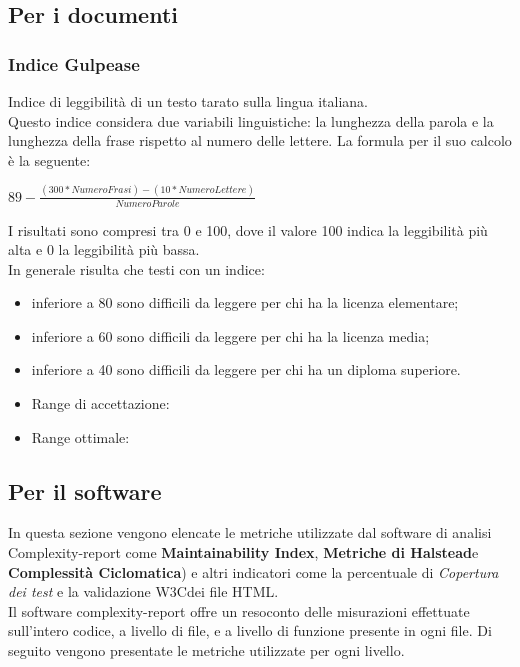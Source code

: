\documentclass[a4paper,11pt]{article}
\begin{document}
\subsection{Per i documenti}

\subsubsection{Indice Gulpease} Indice di leggibilità di un testo tarato sulla lingua italiana. \\
Questo indice considera due variabili linguistiche: la lunghezza della parola e la lunghezza della frase rispetto al numero delle lettere.
La formula per il suo calcolo è la seguente:\\
\begin{center}
\begin{math}
89 - \frac{(300 * NumeroFrasi) - (10 * NumeroLettere)}{NumeroParole}
\end{math}
\end{center}
I risultati sono compresi tra 0 e 100, dove il valore 100 indica la leggibilità più alta e 0 la leggibilità più bassa.\\
In generale risulta che testi con un indice:
\begin{itemize}
\item inferiore a 80 sono difficili da leggere per chi ha la licenza elementare;
\item inferiore a 60 sono difficili da leggere per chi ha la licenza media;
\item inferiore a 40 sono difficili da leggere per chi ha un diploma superiore.
\end{itemize}
\begin{itemize}
\item Range di accettazione: \begin{math}[50 - 100]\end{math}
\item Range ottimale: \begin{math}[60 - 100]\end{math}
\end{itemize}
\subsection{Per il software}

In questa sezione vengono elencate le metriche utilizzate dal software di analisi Complexity-report come \textbf{Maintainability Index}\addglos, \textbf{Metriche di Halstead}\addglos e \textbf{Complessità Ciclomatica}\addglos) e altri indicatori come la percentuale di \textit{Copertura dei test} e la validazione W3C\addglos dei file HTML\addglos.  
\\
Il software complexity-report offre un resoconto delle misurazioni effettuate sull'intero codice, a livello di file, e a livello di funzione presente in ogni file. 
Di seguito vengono presentate le metriche utilizzate per ogni livello.
\end{document}
